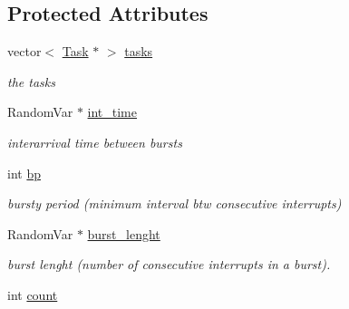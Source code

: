 \subsection*{Protected Attributes}
\begin{DoxyCompactItemize}
\item 
vector$<$ \hyperlink{classRTSim_1_1Task}{Task} $\ast$ $>$ \hyperlink{classRTSim_1_1Interrupt_ae0773eec55b4427f8bcb56e535ab9eb2}{tasks}\hypertarget{classRTSim_1_1Interrupt_ae0773eec55b4427f8bcb56e535ab9eb2}{}\label{classRTSim_1_1Interrupt_ae0773eec55b4427f8bcb56e535ab9eb2}

\begin{DoxyCompactList}\small\item\em the tasks \end{DoxyCompactList}\item 
Random\+Var $\ast$ \hyperlink{classRTSim_1_1Interrupt_acd6a11338c9cccccf3037ffb8fcdbfc1}{int\+\_\+time}\hypertarget{classRTSim_1_1Interrupt_acd6a11338c9cccccf3037ffb8fcdbfc1}{}\label{classRTSim_1_1Interrupt_acd6a11338c9cccccf3037ffb8fcdbfc1}

\begin{DoxyCompactList}\small\item\em interarrival time between bursts \end{DoxyCompactList}\item 
int \hyperlink{classRTSim_1_1Interrupt_a0fd3c453393cf93298254c080ba11220}{bp}\hypertarget{classRTSim_1_1Interrupt_a0fd3c453393cf93298254c080ba11220}{}\label{classRTSim_1_1Interrupt_a0fd3c453393cf93298254c080ba11220}

\begin{DoxyCompactList}\small\item\em bursty period (minimum interval btw consecutive interrupts) \end{DoxyCompactList}\item 
Random\+Var $\ast$ \hyperlink{classRTSim_1_1Interrupt_a4c884a2c62424abbdd3971a16f8bf0af}{burst\+\_\+lenght}\hypertarget{classRTSim_1_1Interrupt_a4c884a2c62424abbdd3971a16f8bf0af}{}\label{classRTSim_1_1Interrupt_a4c884a2c62424abbdd3971a16f8bf0af}

\begin{DoxyCompactList}\small\item\em burst lenght (number of consecutive interrupts in a burst). \end{DoxyCompactList}\item 
int \hyperlink{classRTSim_1_1Interrupt_a319f89d14cb8041e54d763d9b1c19d8f}{count}\hypertarget{classRTSim_1_1Interrupt_a319f89d14cb8041e54d763d9b1c19d8f}{}\label{classRTSim_1_1Interrupt_a319f89d14cb8041e54d763d9b1c19d8f}


\end{DoxyCompactItemize}
